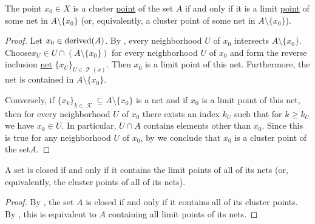 \begin{proposition}\label{thm:cluster_point_of_set_iff_limit_point_of_net}
  The point \( x_0 \in X \) is a cluster \hyperref[def:topological_derived_set/cluster_point]{point} of the set \( A \) if and only if it is a limit \hyperref[def:net_convergence/cluster]{point} of some net in \( A \setminus \{ x_0 \} \) (or, equivalently, a cluster point of some net in \( A \setminus \{ x_0 \} \)).
\end{proposition}
\begin{proof}
  \SufficiencySubProof Let \( x_0 \in \operatorname{derived}(A) \). By , every neighborhood \( U \) of \( x_0 \) intersects \( A \setminus \{ x_0 \} \). Choose\LEM \( x_U \in U \cap (A \setminus \{ x_0 \}) \) for every neighborhood \( U \) of \( x_0 \) and form the reverse inclusion \hyperref[ex:reverse_inclusion_net]{net} \( \{ x_U \}_{U \in \mscrT(x)} \). Then \( x_0 \) is a limit point of this net. Furthermore, the net is contained in \( A \setminus \{ x_0 \} \).

  \NecessitySubProof Conversely, if \( \{ x_k \}_{k \in \mscrK} \subseteq A \setminus \{ x_0 \} \) is a net and if \( x_0 \) is a limit point of this net, then for every neighborhood \( U \) of \( x_0 \) there exists an index \( k_U \) such that for \( k \geq k_U \) we have \(  x_k \in U \). In particular, \( U \cap A \) contains elements other than \( x_0 \). Since this is true for any neighborhood \( U \) of \( x_0 \), by  we conclude that \( x_0 \) is a cluster point of the set\( A \).
\end{proof}

\begin{corollary}\label{thm:closed_iff_contains_all_net_cluster_points}
  A set is closed if and only if it contains the limit points of all of its nets (or, equivalently, the cluster points of all of its nets).
\end{corollary}
\begin{proof}
  By , the set \( A \) is closed if and only if it contains all of its cluster points. By , this is equivalent to \( A \) containing all limit points of its nets.
\end{proof}

